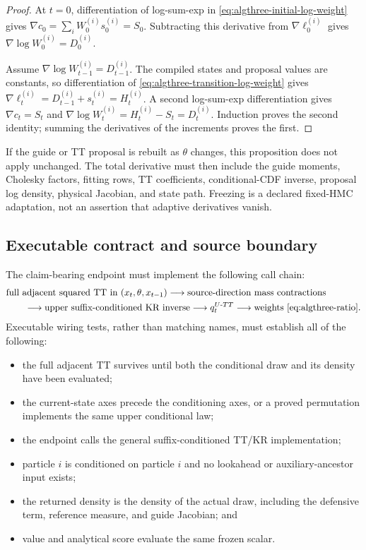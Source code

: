 \documentclass[11pt]{article}
\begin{document}
\begin{proof}
At $t=0$, differentiation of log-sum-exp in
\eqref{eq:algthree-initial-log-weight} gives
$\nabla c_0=\sum_iW_0^{(i)}s_0^{(i)}=S_0$.  Subtracting this derivative from
$\nabla\ell_0^{(i)}$ gives $\nabla\log W_0^{(i)}=D_0^{(i)}$.

Assume $\nabla\log W_{t-1}^{(i)}=D_{t-1}^{(i)}$.  The compiled states and
proposal values are constants, so differentiation of
\eqref{eq:algthree-transition-log-weight} gives
$\nabla\ell_t^{(i)}=D_{t-1}^{(i)}+s_t^{(i)}=H_t^{(i)}$.  A second
log-sum-exp differentiation gives $\nabla c_t=S_t$ and
$\nabla\log W_t^{(i)}=H_t^{(i)}-S_t=D_t^{(i)}$.  Induction proves the second
identity; summing the derivatives of the increments proves the first.
\end{proof}

If the guide or TT proposal is rebuilt as $\theta$ changes, this proposition
does not apply unchanged.  The total derivative must then include the guide
moments, Cholesky factors, fitting rows, TT coefficients, conditional-CDF
inverse, proposal log density, physical Jacobian, and state path.  Freezing is
a declared fixed-HMC adaptation, not an assertion that adaptive derivatives
vanish.

\subsection{Executable contract and source boundary}

The claim-bearing endpoint must implement the following call chain:
\begin{align*}
 &\text{full adjacent squared TT in }(x_t,\theta,x_{t-1})
   \longrightarrow \text{source-direction mass contractions}\\
 &\hspace{2em}\longrightarrow \text{upper suffix-conditioned KR inverse}
   \longrightarrow q_t^{U\text{-}TT}
   \longrightarrow \text{weights \eqref{eq:algthree-ratio}}.
\end{align*}
Executable wiring tests, rather than matching names, must establish all of the
following:
\begin{itemize}
\item the full adjacent TT survives until both the conditional draw and its
  density have been evaluated;
\item the current-state axes precede the conditioning axes, or a proved
  permutation implements the same upper conditional law;
\item the endpoint calls the general suffix-conditioned TT/KR implementation;
\item particle $i$ is conditioned on particle $i$ and no lookahead or
  auxiliary-ancestor input exists;
\item the returned density is the density of the actual draw, including the
  defensive term, reference measure, and guide Jacobian; and
\item value and analytical score evaluate the same frozen scalar.
\end{itemize}
\end{document}
